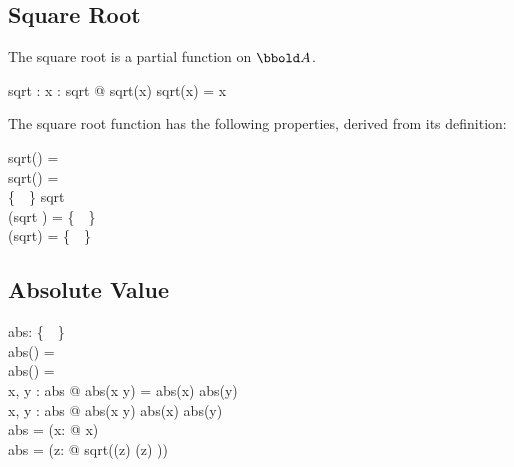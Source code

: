 \documentclass[12pt]{article}
\begin{document}

\subsection{Square Root}
\label{sec:square-root}
The square root is a partial function on $\arithmos$.
\begin{axdef}
  sqrt : \arithmos \pfun \arithmos
  \where
  \forall x : \dom sqrt @ sqrt(x) \amult sqrt(x) = x
\end{axdef}

The square root function has the following properties, derived from
its definition:
\begin{zed}
  sqrt(\azero) = \azero\\
  sqrt(\aone) = \aone\\
  \realplus \cup \{~\azero~\} \subseteq \dom sqrt\\
  \dom (sqrt \rres \real) = \realplus \cup \{~\azero~\}\\
  \ran (\real \dres sqrt) = \realplus \cup \{~\azero~\}\\
\end{zed}

\subsection{Absolute Value}
\label{sec:abs}

\begin{axdef}
  abs: \arithmos \pfun \realplus \cup \{~\azero~\}\\
  \where
  abs(\azero) = \azero\\
  abs(\aone) = \aone\\
  \forall x, y : \dom abs @ abs(x \amult y) = abs(x) \amult abs(y)\\
  \forall x, y : \dom abs @ abs(x \aplus y) \aleq abs(x) \aplus
  abs(y)\\
  \real \dres abs = \id \real \oplus (\lambda x: \realminus @ \aneg
  x)\\
  \complex \dres abs = (\lambda z: \complex @ sqrt(\Re(z) 
  \aplus \Im(z) ))
\end{axdef}
\end{document}
